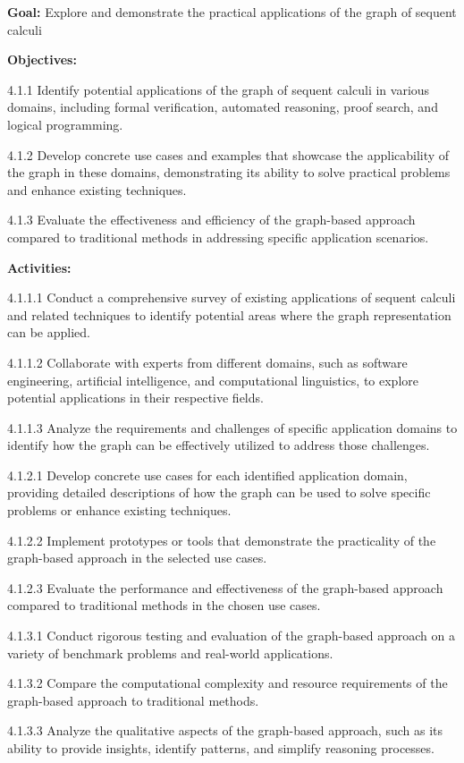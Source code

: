 \textbf{Goal:} Explore and demonstrate the practical applications of the
graph of sequent calculi

\textbf{Objectives:}

4.1.1 Identify potential applications of the graph of sequent calculi in
various domains, including formal verification, automated reasoning,
proof search, and logical programming.

4.1.2 Develop concrete use cases and examples that showcase the
applicability of the graph in these domains, demonstrating its ability
to solve practical problems and enhance existing techniques.

4.1.3 Evaluate the effectiveness and efficiency of the graph-based
approach compared to traditional methods in addressing specific
application scenarios.

\textbf{Activities:}

4.1.1.1 Conduct a comprehensive survey of existing applications of
sequent calculi and related techniques to identify potential areas where
the graph representation can be applied.

4.1.1.2 Collaborate with experts from different domains, such as
software engineering, artificial intelligence, and computational
linguistics, to explore potential applications in their respective
fields.

4.1.1.3 Analyze the requirements and challenges of specific application
domains to identify how the graph can be effectively utilized to address
those challenges.

4.1.2.1 Develop concrete use cases for each identified application
domain, providing detailed descriptions of how the graph can be used to
solve specific problems or enhance existing techniques.

4.1.2.2 Implement prototypes or tools that demonstrate the practicality
of the graph-based approach in the selected use cases.

4.1.2.3 Evaluate the performance and effectiveness of the graph-based
approach compared to traditional methods in the chosen use cases.

4.1.3.1 Conduct rigorous testing and evaluation of the graph-based
approach on a variety of benchmark problems and real-world applications.

4.1.3.2 Compare the computational complexity and resource requirements
of the graph-based approach to traditional methods.

4.1.3.3 Analyze the qualitative aspects of the graph-based approach,
such as its ability to provide insights, identify patterns, and simplify
reasoning processes.

